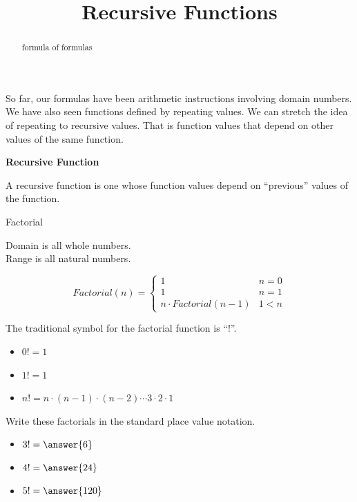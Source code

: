 \documentclass{ximera}
\title{Recursive Functions}
\begin{document}
\begin{abstract}
formula of formulas
\end{abstract}
\maketitle



So far, our formulas have been arithmetic instructions involving domain numbers. We have also seen functions defined by repeating values. We can stretch the idea of repeating to recursive values.  That is function values that depend on other values of the same function.




\begin{idea} \textbf{\textcolor{blue!55!black}{Recursive Function}}


A recursive function is one whose function values depend on ``previous'' values of the function.

\end{idea}




\begin{example}  Factorial 



Domain is all whole numbers. \\
Range is all natural numbers. 




\[
Factorial(n) = 
\begin{cases}
  1 & n = 0 \\
  1 & n = 1 \\ 
  n \cdot Factorial(n-1) & 1 < n
\end{cases}
\]

The traditional symbol for the factorial function is ``!''.


\begin{itemize}
  \item $0! = 1$
  \item $1! = 1$
  \item $n! = n \cdot (n-1) \cdot (n-2) \cdots 3 \cdot 2 \cdot 1$
\end{itemize}





\begin{question} 


Write these factorials in the standard place value notation.


\begin{itemize}
\item $3! = \answer{6}$
\item $4! = \answer{24}$
\item $5! = \answer{120}$
\end{itemize}


\end{question}



\end{example}
\end{document}

